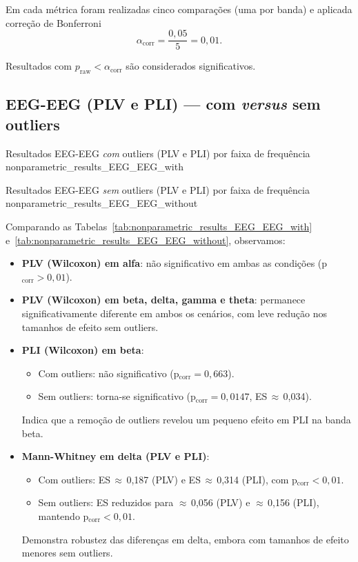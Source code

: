 Em cada métrica foram realizadas cinco comparações (uma por banda) e aplicada correção de Bonferroni
\[
  \alpha_{\mathrm{corr}} = \frac{0{,}05}{5} = 0{,}01.
\]

Resultados com \(p_{\mathrm{raw}} < \alpha_{\mathrm{corr}}\) são considerados significativos.

\clearpage
\subsection{EEG-EEG (PLV e PLI) — com \textit{versus} sem outliers}

{Resultados EEG-EEG \textit{com} outliers (PLV e PLI) por faixa de frequência}
{nonparametric_results_EEG_EEG_with}

\clearpage
{}
{Resultados EEG-EEG \textit{sem} outliers (PLV e PLI) por faixa de frequência}
{nonparametric_results_EEG_EEG_without}

\clearpage
Comparando as Tabelas~\ref{tab:nonparametric_results_EEG_EEG_with} e~\ref{tab:nonparametric_results_EEG_EEG_without}, observamos:
\begin{itemize}
  \item \textbf{PLV (Wilcoxon) em alfa}: não significativo em ambas as condições (p$_\mathrm{corr}>0{,}01$).
  \item \textbf{PLV (Wilcoxon) em beta, delta, gamma e theta}: permanece significativamente diferente em ambos os cenários, com leve redução nos tamanhos de efeito sem outliers.
  \item \textbf{PLI (Wilcoxon) em beta}:
    \begin{itemize}
      \item Com outliers: não significativo (p$_\mathrm{corr}=0{,}663$).
      \item Sem outliers: torna-se significativo (p$_\mathrm{corr}=0{,}0147$, ES\,$\approx$\,0,034).
    \end{itemize}
    Indica que a remoção de outliers revelou um pequeno efeito em PLI na banda beta.
  \item \textbf{Mann-Whitney em delta (PLV e PLI)}:
    \begin{itemize}
      \item Com outliers: ES\,$\approx$\,0,187 (PLV) e ES\,$\approx$\,0,314 (PLI), com p$_\mathrm{corr}<0{,}01$.
      \item Sem outliers: ES reduzidos para $\approx$\,0,056 (PLV) e $\approx$\,0,156 (PLI), mantendo p$_\mathrm{corr}<0{,}01$.
    \end{itemize}
    Demonstra robustez das diferenças em delta, embora com tamanhos de efeito menores sem outliers.
\end{itemize}

